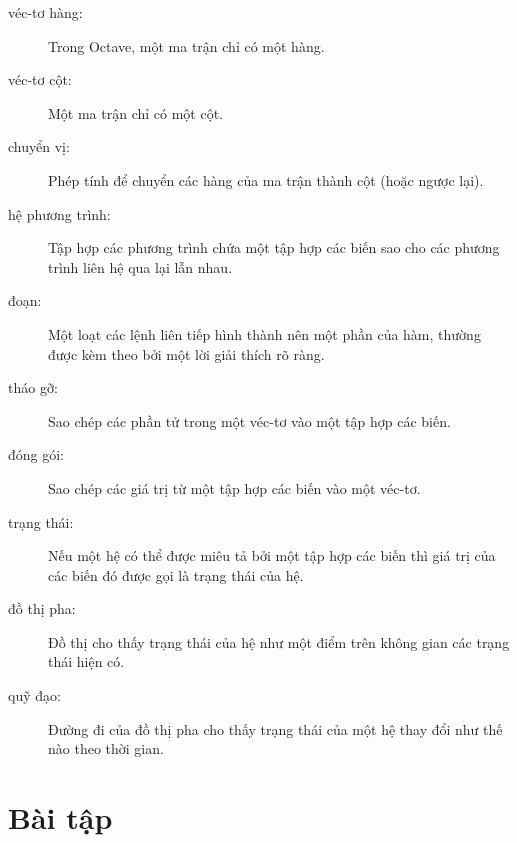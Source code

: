 \documentclass[12pt]{book}
\begin{document}
\begin{description}

\item[véc-tơ hàng:] Trong Octave, một ma trận chỉ có một hàng.

\item[véc-tơ cột:] Một ma trận chỉ có một cột. 

\item[chuyển vị:] Phép tính để chuyển các hàng của ma trận thành
cột (hoặc ngược lại).

\item[hệ phương trình:] Tập hợp các phương trình chứa một tập hợp
các biến sao cho các phương trình liên hệ qua lại lẫn nhau.

\item[đoạn:] Một loạt các lệnh liên tiếp hình thành nên một phần của
hàm, thường được kèm theo bởi một lời giải thích rõ ràng.

\item[tháo gỡ:] Sao chép các phần tử trong một véc-tơ vào một 
tập hợp các biến.

\item[đóng gói:] Sao chép các giá trị từ một tập hợp các biến vào
một véc-tơ.

\item[trạng thái:] Nếu một hệ có thể được miêu tả bởi một tập hợp 
các biến thì giá trị của các biến đó được gọi là trạng thái của hệ.

\item[đồ thị pha:] Đồ thị cho thấy trạng thái của hệ như một điểm
trên không gian các trạng thái hiện có.

\item[quỹ đạo:] Đường đi của đồ thị pha cho thấy trạng thái của
một hệ thay đổi như thế nào theo thời gian.


\end{description}

\section{Bài tập}
\end{document}
